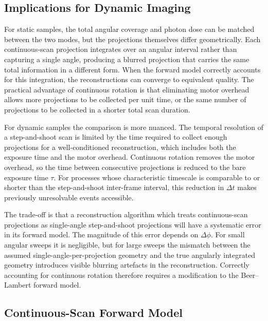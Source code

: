 \documentclass[12pt, a4paper, twoside]{report}
\begin{document}
\subsection{Implications for Dynamic Imaging}
\label{subsec:cont_dynamic_implications}

For static samples, the total angular coverage and photon dose can be matched between the two modes, but the projections themselves differ geometrically. Each continuous-scan projection integrates over an angular interval rather than capturing a single angle, producing a blurred projection that carries the same total information in a different form. When the forward model correctly accounts for this integration, the reconstructions can converge to equivalent quality. The practical advantage of continuous rotation is that eliminating motor overhead allows more projections to be collected per unit time, or the same number of projections to be collected in a shorter total scan duration.

For dynamic samples the comparison is more nuanced. The temporal resolution of a step-and-shoot scan is limited by the time required to collect enough projections for a well-conditioned reconstruction, which includes both the exposure time and the motor overhead. Continuous rotation removes the motor overhead, so the time between consecutive projections is reduced to the bare exposure time $\tau$. For processes whose characteristic timescale is comparable to or shorter than the step-and-shoot inter-frame interval, this reduction in $\Delta t$ makes previously unresolvable events accessible.

The trade-off is that a reconstruction algorithm which treats continuous-scan projections as single-angle step-and-shoot projections will have a systematic error in its forward model. The magnitude of this error depends on $\Delta\phi$. For small angular sweeps it is negligible, but for large sweeps the mismatch between the assumed single-angle-per-projection geometry and the true angularly integrated geometry introduces visible blurring artefacts in the reconstruction. Correctly accounting for continuous rotation therefore requires a modification to the Beer--Lambert forward model.


\subsection{Continuous-Scan Forward Model}
\label{subsec:cont_forward_theory}
\end{document}
